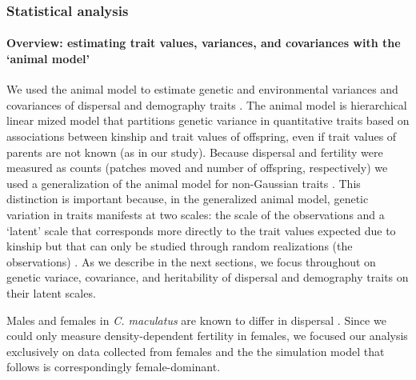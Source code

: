 \subsubsection{Statistical analysis}
\paragraph{Overview: estimating trait values, variances, and covariances with the `animal model'}
We used the animal model to estimate genetic and environmental variances and covariances of dispersal and demography traits \citep{lynch_genetics_1998,kruuk_estimating_2004,wilson_ecologists_2010}. The animal model is hierarchical linear mized model that partitions genetic variance in quantitative traits based on associations between kinship and trait values of offspring, even if trait values of parents are not known (as in our study). Because dispersal and fertility were measured as counts (patches moved and number of offspring, respectively) we used a generalization of the animal model for non-Gaussian traits \citep{de2016general}. This distinction is important because, in the generalized animal model, genetic variation in traits manifests at two scales: the scale of the observations and a `latent' scale that corresponds more directly to the trait values expected due to kinship but that can only be studied through random realizations (the observations) \citep{de2016general}. As we describe in the next sections, we focus throughout on genetic variace, covariance, and heritability of dispersal and demography traits on their latent scales.

Males and females in \textit{C. maculatus} are known to differ in dispersal \citep{miller_sex_2013,ochocki_rapid_2017}. Since we could only measure density-dependent fertility in females, we focused our analysis exclusively on data collected from females and the the simulation model that follows is correspondingly female-dominant.

